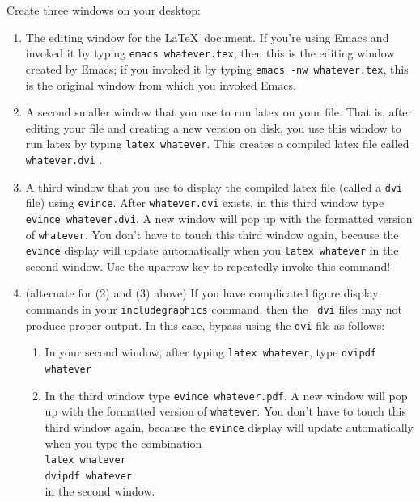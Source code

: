 \documentclass[12pt,preprint]{aastex}
\begin{document}
Create three windows on your desktop: \begin{enumerate}

\item The editing window for the \LaTeX\ document. If you're using Emacs
  and invoked it by typing {\tt emacs whatever.tex},
  then this is the editing window created by Emacs; if you invoked it by
  typing {\tt emacs -nw whatever.tex}, this is the original window from
  which you invoked Emacs.

\item A second smaller window that you use to run latex on your
  file. That is, after editing your file and creating a new version on
  disk, you use this window to run latex by typing {\tt latex
    whatever}. This creates a compiled latex file called {\tt
    whatever.dvi} .

\item A third window that you use to display the compiled latex file
  (called a {\tt dvi} file) using {\tt evince}. After {\tt whatever.dvi}
  exists, in this third window type {\tt evince whatever.dvi}. A new
  window will pop up with the formatted version of {\tt whatever}. You
  don't have to touch this third window again, because the {\tt evince}
  display will update automatically when you {\tt latex whatever} in the
  second window. Use the uparrow key to repeatedly invoke this command!

\item (alternate for (2) and (3) above) If you have complicated figure
  display commands in your {\tt includegraphics} command, then the {\tt
    dvi} files may not produce proper output. In this case, bypass using
  the {\tt dvi} file as follows: \begin{enumerate}

\item In your second window, after typing {\tt latex
    whatever}, type {\tt dvipdf whatever}

\item In the third window type {\tt evince whatever.pdf}. A new window
  will pop up with the formatted version of {\tt whatever}. You don't
  have to touch this third window again, because the {\tt evince}
  display will update automatically when you type the combination \\ 
  \hspace*{3ex} {\tt latex whatever} \\ 
  \hspace*{3ex} {\tt dvipdf whatever} \\ 
in the second window.

\end{enumerate}
\end{enumerate}
\end{document}
